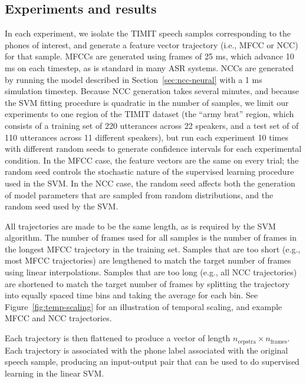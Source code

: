 \subsection{Experiments and results}

In each experiment,
we isolate the TIMIT speech samples
corresponding to the phones
of interest,
and generate a feature vector trajectory
(i.e., MFCC or NCC)
for that sample.
MFCCs are generated using frames
of 25 ms,
which advance 10 ms on each timestep,
as is standard in many ASR systems.
NCCs are generated
by running the model described in
Section~\ref{sec:ncc-neural} with a 1 ms simulation timestep.
Because NCC generation takes several minutes,
and because the SVM fitting procedure
is quadratic in the number of samples,
we limit our experiments to
one region of the TIMIT dataset
(the ``army brat'' region,
which consists of a training set
of 220 utterances across 22 speakers,
and a test set of of 110 utterances
across 11 different speakers),
but run each experiment
10 times with different random seeds
to generate confidence intervals
for each experimental condition.
In the MFCC case,
the feature vectors are the same
on every trial;
the random seed controls the
stochastic nature of
the supervised learning procedure
used in the SVM.
In the NCC case,
the random seed affects both
the generation of model parameters
that are sampled from random distributions,
and the random seed used by the SVM.

All trajectories are
made to be the same length,
as is required by the SVM algorithm.
The number of frames used
for all samples is
the number of frames in
the longest MFCC trajectory
in the training set.
Samples that are too short
(e.g., most MFCC trajectories)
are lengthened to match the
target number of frames
using linear interpolations.
Samples that are too long
(e.g., all NCC trajectories)
are shortened to match the
target number of frames
by splitting the trajectory
into equally spaced time bins
and taking the average
for each bin.
See Figure~\ref{fig:temp-scaling} for
an illustration of temporal scaling,
and example MFCC and NCC trajectories.


Each trajectory is then flattened
to produce a vector of length
$n_{\text{cepstra}} \times n_{\text{frames}}$.
Each trajectory is associated with
the phone label associated with
the original speech sample,
producing an input-output pair
that can be used to do supervised learning
in the linear SVM.

